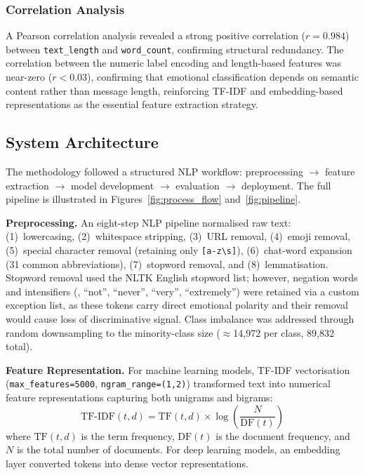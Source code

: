 \subsubsection{Correlation Analysis}

A Pearson correlation analysis revealed a strong positive correlation ($r = 0.984$) between \texttt{text\_length} and \texttt{word\_count}, confirming structural redundancy. The correlation between the numeric label encoding and length-based features was near-zero ($r < 0.03$), confirming that emotional classification depends on semantic content rather than message length, reinforcing TF-IDF and embedding-based representations as the essential feature extraction strategy.

\subsection{System Architecture}

The methodology followed a structured NLP workflow: preprocessing $\rightarrow$ feature extraction $\rightarrow$ model development $\rightarrow$ evaluation $\rightarrow$ deployment. The full pipeline is illustrated in Figures~\ref{fig:process_flow} and~\ref{fig:pipeline}.

\textbf{Preprocessing.} An eight-step NLP pipeline normalised raw text: (1)~lowercasing, (2)~whitespace stripping, (3)~URL removal, (4)~emoji removal, (5)~special character removal (retaining only \texttt{[a-z\textbackslash s]}), (6)~chat-word expansion (31 common abbreviations), (7)~stopword removal, and (8)~lemmatisation. Stopword removal used the NLTK English stopword list; however, negation words and intensifiers (\eg, ``not'', ``never'', ``very'', ``extremely'') were retained via a custom exception list, as these tokens carry direct emotional polarity and their removal would cause loss of discriminative signal. Class imbalance was addressed through random downsampling to the minority-class size ($\approx$14,972 per class, 89,832 total).

\textbf{Feature Representation.} For machine learning models, TF-IDF vectorisation (\texttt{max\_features=5000}, \texttt{ngram\_range=(1,2)}) transformed text into numerical feature representations capturing both unigrams and bigrams:
\begin{equation}
\text{TF-IDF}(t, d) = \text{TF}(t, d) \times \log\!\left(\frac{N}{\text{DF}(t)}\right)
\label{eq:tfidf}
\end{equation}
where $\text{TF}(t,d)$ is the term frequency, $\text{DF}(t)$ is the document frequency, and $N$ is the total number of documents. For deep learning models, an embedding layer converted tokens into dense vector representations.

